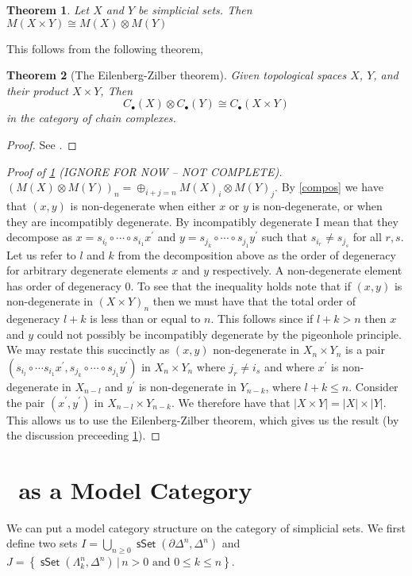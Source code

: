 \documentclass{amsart}
\newcommand{\catname}[1]{{\sffamily\upshape{{#1}}}}
\newcommand{\sset}{\catname{sSet}}
\DeclareMathOperator{\msset}{\mathsf{sSet}}
\newtheorem{theorem}{Theorem}[section]
\theoremstyle{definition}
\begin{document}
\begin{theorem}\label{main}
  Let $X$ and $Y$ be simplicial sets. Then
  $M(X\times Y)\cong M(X)\otimes M(Y)$
\end{theorem}
This follows from the following theorem,
\begin{theorem}[The Eilenberg-Zilber theorem]
  Given topological spaces $X$, $Y$, and their product $X\times Y$,
  Then $$C_\bullet (X)\otimes C_\bullet (Y) \cong C_\bullet(X\times Y)$$
  in the category of chain complexes.
\end{theorem}
\begin{proof}
  See \cite{EZ}.
\end{proof}
\begin{proof}[Proof of \ref{main} (IGNORE FOR NOW -- NOT COMPLETE)]
  $\left(M(X)\otimes M(Y)\right)_n = \oplus_{i+j=n} M(X)_i \otimes M(Y)_j$.
  By \ref{compos} we have that $(x,y)$ is non-degenerate when either $x$ or
  $y$ is non-degenerate, or when they are incompatibly degenerate. By incompatibly
  degenerate I mean that they decompose as
  $x=s_{i_l}\circ\cdots \circ s_{i_1} x^\prime$ and
  $y=s_{j_k}\circ \cdots \circ s_{j_1} y^\prime$ such that $s_{i_r}\neq s_{j_s}$
  for all $r,s$. Let us refer to $l$ and $k$ from the decomposition above
  as the order of degeneracy for
  arbitrary degenerate elements $x$ and $y$ respectively. A non-degenerate element
  has order of degeneracy 0. To see that the inequality
  holds note that if $(x,y)$ is non-degenerate in $(X\times Y)_n$ then we must have
  that the total order of degeneracy $l+k$ is less than or equal to $n$.
  This follows since if $l+k >n$ then $x$ and $y$ could not possibly be
  incompatibly degenerate by the pigeonhole principle. We may restate this
  succinctly as $(x,y)$ non-degenerate in $X_n\times Y_n$ is
  a pair $(s_{i_l}\circ \cdots s_{i_1} x^\prime, s_{j_k}\circ
  \cdots \circ s_{j_1}y^\prime)$ in $X_n\times Y_n$ where $j_r \neq i_s$ and
  where $x^\prime$ is
  non-degenerate in $X_{n-l}$ and $y^\prime$ is non-degenerate in $Y_{n-k}$,
  where $l+k\leq n$.
  Consider the pair $(x^\prime,y^\prime)$ in $X_{n-l}\times Y_{n-k}$.
  We therefore have that $|X\times Y| = |X| \times |Y|$. This allows us to use
  the Eilenberg-Zilber theorem, which gives us the result (by the discussion
  preceeding \ref{main}).
\end{proof}

\section{\sset  \, as a Model Category}
We can put a model category structure on the category of simplicial sets.
We first define two sets $I= \bigcup_{n\geq 0}\msset (\partial \Delta^n, \Delta^n)$
and $J= \left\{ \msset (\Lambda^n_k, \Delta^n)\, \big| \, n>0
  \text{ and }0\leq k\leq n \right\}$.
\end{document}

